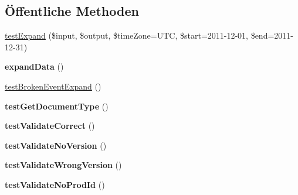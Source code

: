 \subsection*{Öffentliche Methoden}
\begin{DoxyCompactItemize}
\item 
\mbox{\hyperlink{class_sabre_1_1_v_object_1_1_component_1_1_v_calendar_test_a0696d1d6ce5c1529149793704dc75d4d}{test\+Expand}} (\$input, \$output, \$time\+Zone=\textquotesingle{}U\+TC\textquotesingle{}, \$start=\textquotesingle{}2011-\/12-\/01\textquotesingle{}, \$end=\textquotesingle{}2011-\/12-\/31\textquotesingle{})
\item 
\mbox{\label{class_sabre_1_1_v_object_1_1_component_1_1_v_calendar_test_a427c15853940a514df81d32056fb2024}} 
{\bfseries expand\+Data} ()
\item 
\mbox{\hyperlink{class_sabre_1_1_v_object_1_1_component_1_1_v_calendar_test_a1f3c5983868949c93e2bd62478ddb0f9}{test\+Broken\+Event\+Expand}} ()
\item 
\mbox{\label{class_sabre_1_1_v_object_1_1_component_1_1_v_calendar_test_abb9f7911ec7907daf30558952df2dc38}} 
{\bfseries test\+Get\+Document\+Type} ()
\item 
\mbox{\label{class_sabre_1_1_v_object_1_1_component_1_1_v_calendar_test_a3444190f162f68a47735ddbf49adc19d}} 
{\bfseries test\+Validate\+Correct} ()
\item 
\mbox{\label{class_sabre_1_1_v_object_1_1_component_1_1_v_calendar_test_aa08b0e353f0d9f5e83cb9f760393529f}} 
{\bfseries test\+Validate\+No\+Version} ()
\item 
\mbox{\label{class_sabre_1_1_v_object_1_1_component_1_1_v_calendar_test_aec59298a825930d267f7a9516461283e}} 
{\bfseries test\+Validate\+Wrong\+Version} ()
\item 
\mbox{\label{class_sabre_1_1_v_object_1_1_component_1_1_v_calendar_test_a00ae39f2afa85f94ee86a0a133438e0a}} 
{\bfseries test\+Validate\+No\+Prod\+Id} ()

\end{DoxyCompactItemize}
